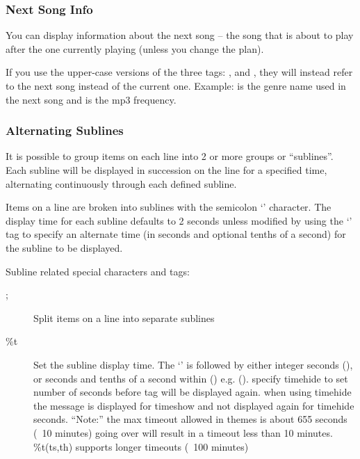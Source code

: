 \subsubsection{Next Song Info}
You can display information about the next song -- the song that is
about to play after the one currently playing (unless you change the
plan).

If you use the upper-case versions of the
three tags: ,  and , they will instead refer to
the next song instead of the current one. Example:  is the genre
name used in the next song and  is the mp3 frequency.\\


\subsubsection{\label{ref:AlternatingSublines}Alternating Sublines}

It is possible to group items on each line into 2 or more groups or
``sublines''. Each subline will be displayed in succession on the line for a
specified time, alternating continuously through each defined subline.

Items on a line are broken into sublines with the semicolon
`\config{;}' character. The display time for
each subline defaults to 2 seconds unless modified by using the
`' tag to specify an alternate
time (in seconds and optional tenths of a second) for the subline to be
displayed.

Subline related special characters and tags:
\begin{description}
\item[;] Split items on a line into separate sublines
\item[\%t] Set the subline display time. The
`' is followed by either integer seconds (), or seconds
and tenths of a second within () e.g. ().
specify timehide to set number of seconds before tag will be displayed again.
when using timehide the message is displayed for timeshow and not displayed again for timehide seconds.
``Note:'' the max timeout allowed in themes is about 655 seconds (~10 minutes) going over will result in a timeout less than 10 minutes.
        \%t(ts,th) supports longer timeouts (~100 minutes)
\end{description}

